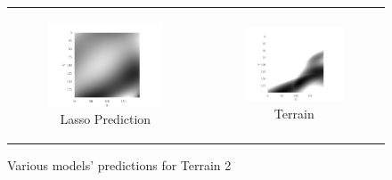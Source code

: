 \begin{figure}[!htbp]
\begin{tabular}{cc}
        \begin{subfigure}[b]{0.45\textwidth}
            \centering
            \includegraphics[width=\textwidth]{examples/tests_even/figs/gradient-descent-terrain-map.pdf}
            \caption{Lasso Prediction}
            \label{fig:lasso}
        \end{subfigure} &
        \begin{subfigure}[b]{0.45\textwidth}
            \centering
            \includegraphics[width=\textwidth]{examples/tests_even/figs/neural-network-terrain-map.pdf}
            \caption{Terrain}
            \label{fig:terrain}
        \end{subfigure}
    \end{tabular}
    \caption{Various models' predictions for Terrain 2}
    \label{fig:main_caption}
\end{figure}

